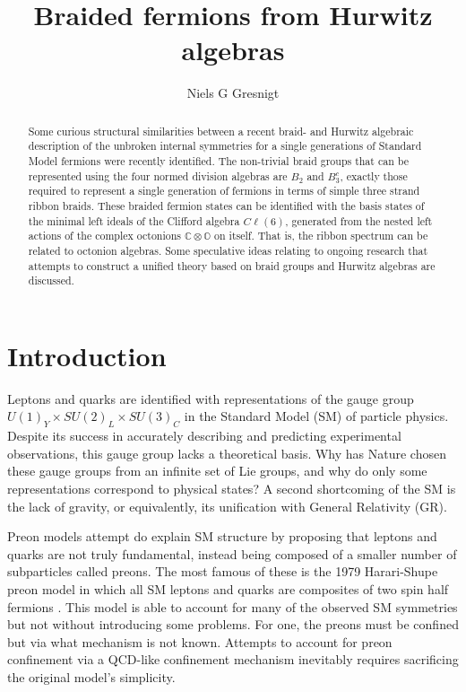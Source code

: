 \documentclass[a4paper]{jpconf}
\begin{document}
\title{Braided fermions from Hurwitz algebras}

\author{Niels G Gresnigt}

\address{Xi'an Jiaotong-Liverpool University, Department of Mathematical Sciences. 111 Ren'ai Road, Dushu Lake Science and Education Innovation District, Suzhou Industrial Park, Suzhou, 215123, P.R. China}


\begin{abstract}

Some curious structural similarities between a recent braid- and Hurwitz algebraic description of the unbroken internal symmetries for a single generations of Standard Model fermions were recently identified. The non-trivial braid groups that can be represented using the four normed division algebras are $B_2$ and $B_3^c$, exactly those required to represent a single generation of fermions in terms of simple three strand ribbon braids. These braided fermion states can be identified with the basis states of the minimal left ideals of the Clifford algebra $C\ell(6)$, generated from the nested left actions of the complex octonions $\mathbb{C}\otimes\mathbb{O}$ on itself. That is, the ribbon spectrum can be related to octonion algebras. Some speculative ideas relating to ongoing research that attempts to construct a unified theory based on braid groups and Hurwitz algebras are discussed.     

\end{abstract}

\section{Introduction}

Leptons and quarks are identified with representations of the gauge group $U(1)_Y\times SU(2)_L\times SU(3)_C$ in the Standard Model (SM) of particle physics. Despite its success in accurately describing and predicting experimental observations, this gauge group lacks a theoretical basis. Why has Nature chosen these gauge groups from an infinite set of Lie groups, and why do only some representations correspond to physical states? A second shortcoming of the SM is the lack of gravity, or equivalently, its unification with General Relativity (GR).

Preon models attempt do explain SM structure by proposing that leptons and quarks are not truly fundamental, instead being composed of a smaller number of subparticles called preons. The most famous of these is the 1979 Harari-Shupe preon model in which all SM leptons and quarks are composites of two spin half fermions \cite{Harari1979,Shupe1979}. This model is able to account for many of the observed SM symmetries but not without introducing some problems. For one, the preons must be confined but via what mechanism is not known. Attempts to account for preon confinement via a QCD-like confinement mechanism inevitably requires sacrificing the original model's simplicity.
\end{document}
